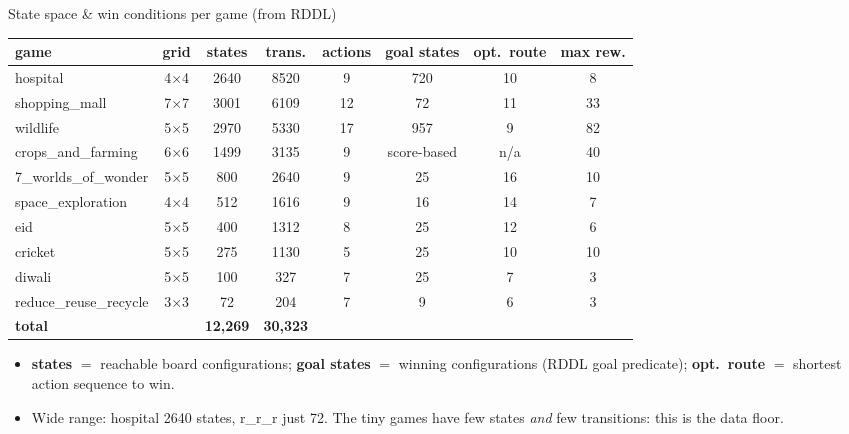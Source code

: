 \documentclass[aspectratio=169,11pt]{beamer}
\newcommand{\good}[1]{\textcolor{good}{#1}}
\begin{document}
\begin{frame}{State space \& win conditions per game (from RDDL)}
  \centering\scriptsize
  \begin{tabular}{@{}lccccccc@{}}
    \toprule
    game & grid & states & trans. & actions & \textbf{goal states} & opt.\ route & max rew. \\
    \midrule
    hospital            & 4$\times$4 & 2640 & 8520 & 9  & \good{720} & 10 & 8 \\
    shopping\_mall      & 7$\times$7 & 3001 & 6109 & 12 & \good{72}  & 11 & 33 \\
    wildlife            & 5$\times$5 & 2970 & 5330 & 17 & \good{957} & 9  & 82 \\
    crops\_and\_farming & 6$\times$6 & 1499 & 3135 & 9  & score-based & n/a & 40 \\
    7\_worlds\_of\_wonder & 5$\times$5 & 800 & 2640 & 9  & \good{25}  & 16 & 10 \\
    space\_exploration  & 4$\times$4 & 512  & 1616 & 9  & \good{16}  & 14 & 7 \\
    eid                 & 5$\times$5 & 400  & 1312 & 8  & \good{25}  & 12 & 6 \\
    cricket             & 5$\times$5 & 275  & 1130 & 5  & \good{25}  & 10 & 10 \\
    diwali              & 5$\times$5 & 100  & 327  & 7  & \good{25}  & 7  & 3 \\
    reduce\_reuse\_recycle & 3$\times$3 & 72 & 204 & 7  & \good{9}   & 6  & 3 \\
    \midrule
    \textbf{total} & & \textbf{12{,}269} & \textbf{30{,}323} & & & & \\
    \bottomrule
  \end{tabular}
  \vspace{0.5em}
  \begin{itemize}\scriptsize
    \item \textbf{states} $=$ reachable board configurations; \textbf{goal states}
          $=$ winning configurations (RDDL goal predicate); \textbf{opt.\ route}
          $=$ shortest action sequence to win.
    \item Wide range: hospital 2640 states, r\_r\_r just 72. The tiny games have
          few states \emph{and} few transitions: this is the data floor.
  \end{itemize}
\end{frame}

%
\end{document}
